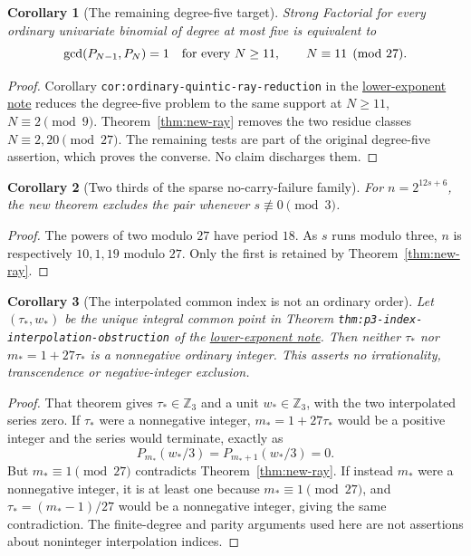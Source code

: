\documentclass[11pt]{article}
\newtheorem{corollary}{Corollary}
\begin{document}
\begin{corollary}[The remaining degree-five target]\label{cor:degree-five-ray}
Strong Factorial for every ordinary univariate binomial of degree
at most five is equivalent to
\[
 \gcd(P_{N-1},P_N)=1
 \quad\hbox{for every }N\ge11,\qquad N\equiv11\pmod{27}.
\]
\end{corollary}
\begin{proof}
Corollary \texttt{cor:ordinary-quintic-}\allowbreak\texttt{ray-reduction} in the
\href{lower_exponent_initial_and_boundary.tex}{lower-exponent note}
reduces the degree-five problem to the same support at
$N\ge11$, $N\equiv2\pmod9$.
Theorem~\ref{thm:new-ray} removes the two residue classes
$N\equiv2,20\pmod{27}$.
The remaining tests are part of the original degree-five assertion,
which proves the converse. No claim discharges them.
\end{proof}

\begin{corollary}[Two thirds of the sparse no-carry-failure family]\label{cor:sparse-family}
For $n=2^{12s+6}$, the new theorem excludes the pair whenever
$s\not\equiv0\pmod3$.
\end{corollary}
\begin{proof}
The powers of two modulo $27$ have period $18$.
As $s$ runs modulo three, $n$ is respectively $10,1,19$ modulo $27$.
Only the first is retained by Theorem~\ref{thm:new-ray}.
\end{proof}
\begin{corollary}[The interpolated common index is not an ordinary order]\label{cor:interpolated-index}
Let $(\tau_*,w_*)$ be the unique integral common point in
Theorem \texttt{thm:p3-index-}\allowbreak\texttt{interpolation-}\allowbreak\texttt{obstruction} of the
\href{lower_exponent_initial_and_boundary.tex}{lower-exponent note}.
Then neither $\tau_*$ nor $m_*=1+27\tau_*$ is a nonnegative ordinary
integer. This asserts no irrationality, transcendence or negative-integer
exclusion.
\end{corollary}
\begin{proof}
That theorem gives $\tau_*\in\mathbb Z_3$ and a unit $w_*\in\mathbb Z_3$,
with the two interpolated series zero. If $\tau_*$ were a nonnegative
integer, $m_*=1+27\tau_*$ would be a positive integer and the series
would terminate, exactly as
\[
 P_{m_*}(w_*/3)=P_{m_*+1}(w_*/3)=0.
\]
But $m_*\equiv1\pmod{27}$ contradicts Theorem~\ref{thm:new-ray}.
If instead $m_*$ were a nonnegative integer, it is at least one
because $m_*\equiv1\pmod{27}$, and
$\tau_*=(m_*-1)/27$ would be a nonnegative integer, giving the same
contradiction. The finite-degree and parity arguments used here
are not assertions about noninteger interpolation indices.
\end{proof}
\end{document}
